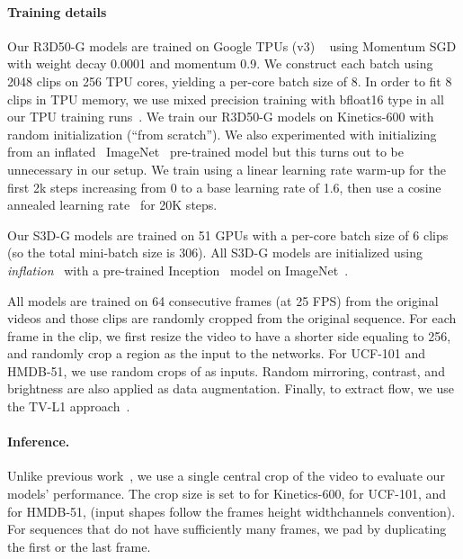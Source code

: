 \documentclass[10pt,twocolumn,letterpaper]{article}
\begin{document}
\paragraph{Training details}
Our R3D50-G models are trained on Google TPUs (v3) ~\cite{kumar2019scale} using Momentum SGD with weight decay 0.0001 and momentum 0.9.  We construct each batch using 2048 clips on 256 TPU cores, yielding a per-core batch size of 8. In order to fit 8 clips in TPU memory, we use mixed precision training with bfloat16 type in all our TPU training runs~\cite{wang2019bfloat16}. We train our R3D50-G models on Kinetics-600 with random initialization (``from scratch''). We also experimented with initializing from an inflated~\cite{carreira2017quo} ImageNet~\cite{deng2009imagenet} pre-trained model but this turns out to be unnecessary in our setup. We train using a linear learning rate warm-up for the first 2k steps increasing from 0 to a base learning rate of 1.6, then use a cosine annealed learning rate~\cite{loshchilov2016sgdr} for 20K steps. 

Our S3D-G models are trained on 51 GPUs with a per-core batch size of 6 clips (so the total mini-batch size is 306). All S3D-G models are initialized using \emph{inflation}~\cite{carreira2017quo} with a pre-trained Inception~\cite{Szegedy1} model on ImageNet~\cite{deng2009imagenet}.

All models are trained on 64 consecutive frames (at 25 FPS) from the original videos and those clips are randomly cropped from the original sequence. For each frame in the clip, we first resize the video to have a shorter side equaling to 256, and randomly crop a  region as the input to the networks. For UCF-101 and HMDB-51, we use random crops of  as inputs. Random mirroring, contrast, and brightness are also applied as data augmentation. 
Finally, to extract flow, we use the TV-L1 approach~\cite{tvl1_flow}.

\paragraph{Inference.} Unlike previous work~\cite{wang2018non,feichtenhofer2019slowfast}, we use a single central crop of the video to evaluate our models' performance. The crop size is set to  for Kinetics-600,  for UCF-101, and  for HMDB-51, (input shapes follow the frames height widthchannels convention). For sequences that do not have sufficiently many frames, we pad by duplicating the first or the last frame. 
\end{document}
